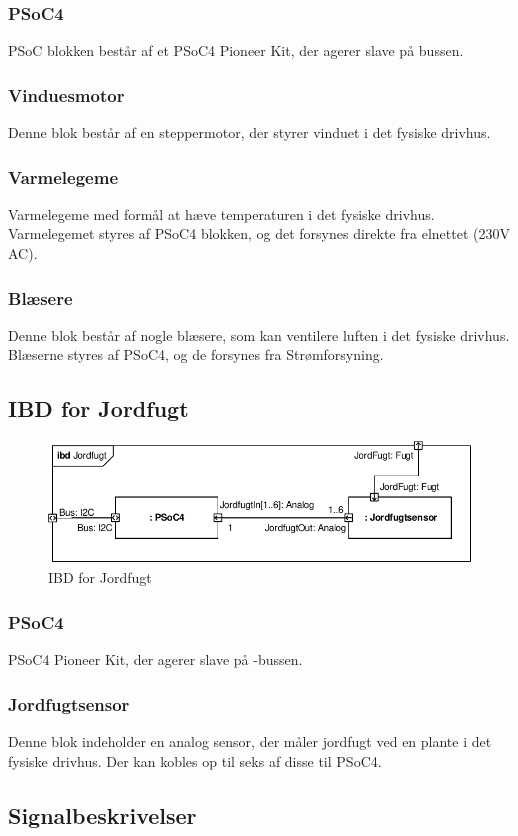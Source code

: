 \subsubsection{PSoC4}
PSoC blokken består af et PSoC4 Pioneer Kit, der agerer slave på \IIC bussen. 
\subsubsection{Vinduesmotor}
Denne blok består af en steppermotor, der styrer vinduet i det fysiske drivhus.
\subsubsection{Varmelegeme}
Varmelegeme med formål at hæve temperaturen i det fysiske drivhus. Varmelegemet styres af PSoC4 blokken, og det forsynes direkte fra elnettet (230V AC). 
\subsubsection{Blæsere}
Denne blok består af nogle blæsere, som kan ventilere luften i det fysiske drivhus. Blæserne styres af PSoC4, og de forsynes fra Strømforsyning. 

\subsection{IBD for Jordfugt}

\begin{figure}[h]
\centering 
\includegraphics[width={\textwidth}] {../fig/ibd_jordfugt.pdf}
\caption{IBD for Jordfugt}
\label{fig:ibd_jordfugt}
\end{figure}

\subsubsection{PSoC4}
PSoC4 Pioneer Kit, der agerer slave på \IIC-bussen. 
\subsubsection{Jordfugtsensor}
Denne blok indeholder en analog sensor, der måler jordfugt ved en plante i det fysiske drivhus. Der kan kobles op til seks af disse til PSoC4.

\subsection{Signalbeskrivelser}


\clearpage